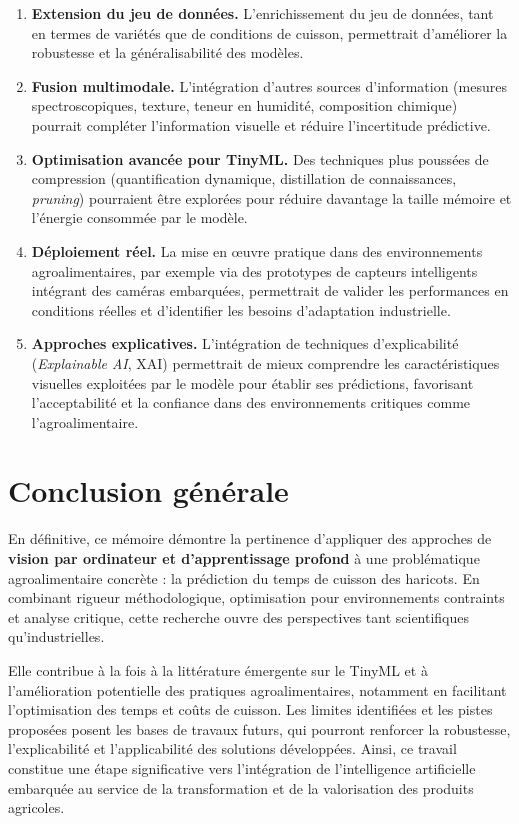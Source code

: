 \begin{enumerate}
	\item \textbf{Extension du jeu de données.} L'enrichissement du jeu de données, tant en termes de variétés que de conditions de cuisson, permettrait d'améliorer la robustesse et la généralisabilité des modèles.
	\item \textbf{Fusion multimodale.} L'intégration d'autres sources d'information (mesures spectroscopiques, texture, teneur en humidité, composition chimique) pourrait compléter l'information visuelle et réduire l'incertitude prédictive.
	\item \textbf{Optimisation avancée pour TinyML.} Des techniques plus poussées de compression (quantification dynamique, distillation de connaissances, \textit{pruning}) pourraient être explorées pour réduire davantage la taille mémoire et l'énergie consommée par le modèle.
	\item \textbf{Déploiement réel.} La mise en œuvre pratique dans des environnements agroalimentaires, par exemple via des prototypes de capteurs intelligents intégrant des caméras embarquées, permettrait de valider les performances en conditions réelles et d'identifier les besoins d'adaptation industrielle.
	\item \textbf{Approches explicatives.} L'intégration de techniques d'explicabilité (\textit{Explainable AI}, XAI) permettrait de mieux comprendre les caractéristiques visuelles exploitées par le modèle pour établir ses prédictions, favorisant l'acceptabilité et la confiance dans des environnements critiques comme l'agroalimentaire.
\end{enumerate}

\section{Conclusion générale}
\label{sec:conclusion_generale}

En définitive, ce mémoire démontre la pertinence d'appliquer des approches de \textbf{vision par ordinateur et d'apprentissage profond} à une problématique agroalimentaire concrète : la prédiction du temps de cuisson des haricots. En combinant rigueur méthodologique, optimisation pour environnements contraints et analyse critique, cette recherche ouvre des perspectives tant scientifiques qu'industrielles.

Elle contribue à la fois à la littérature émergente sur le TinyML et à l'amélioration potentielle des pratiques agroalimentaires, notamment en facilitant l'optimisation des temps et coûts de cuisson. Les limites identifiées et les pistes proposées posent les bases de travaux futurs, qui pourront renforcer la robustesse, l'explicabilité et l'applicabilité des solutions développées. Ainsi, ce travail constitue une étape significative vers l'intégration de l'intelligence artificielle embarquée au service de la transformation et de la valorisation des produits agricoles.

